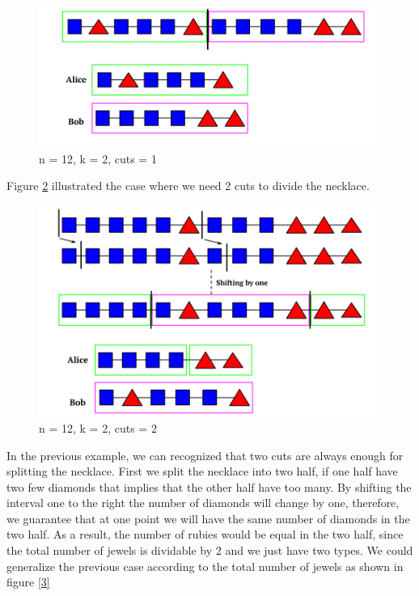 \documentclass[a4paper,10pt]{article}
\begin{document}
\begin{figure}[H]
  \centering
\includegraphics[scale=.35]{k=2 , cuts = 1.png}
\caption{n = 12, k = 2, cuts = 1}
\label{1}
\end{figure}















Figure \ref{2} illustrated the case where we need 2 cuts to divide the necklace.
\begin{figure}[H]
  \centering
\includegraphics[scale=.35]{Copy of k=2 , generalize (2).png}
\caption{n = 12, k = 2, cuts = 2}
\label{2}
\end{figure}

In the previous example, we can recognized that two cuts are always enough for splitting the necklace. First we split the necklace into two half, if one half have two few diamonds that implies that the other half have too many. By shifting the interval one to the right the number of diamonds will change by one, therefore, we guarantee that at one point we will have the same number of diamonds in the two half. As a result, the number of rubies would be equal in the two half, since the total number of jewels is dividable by 2 and we just have two types. We could generalize the previous case according to the total number of jewels as shown in figure \ref{3}
\end{document}
